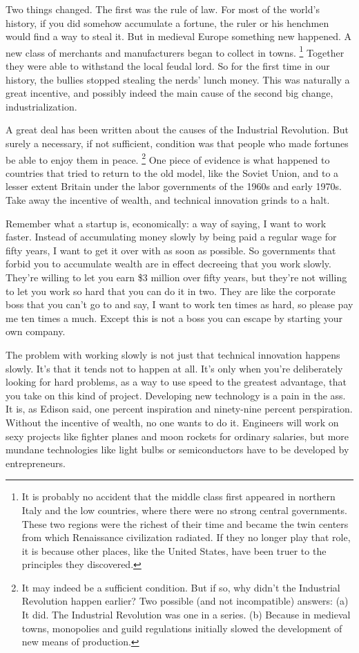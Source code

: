 Two things changed. The first was the rule of law. For most of the
world's history, if you did somehow accumulate a fortune, the ruler or
his henchmen would find a way to steal it. But in medieval Europe
something new happened. A new class of merchants and manufacturers began
to collect in towns. \footnote{It is probably no accident that the middle class first appeared
in northern Italy and the low countries, where there were no strong
central governments. These two regions were the richest of their time
and became the twin centers from which Renaissance civilization
radiated. If they no longer play that role, it is because other places,
like the United States, have been truer to the principles they
discovered.} Together they were able
to withstand the local feudal lord. So for the first time in our
history, the bullies stopped stealing the nerds' lunch money. This was
naturally a great incentive, and possibly indeed the main cause of the
second big change, industrialization.

A great deal has been written about the causes of the Industrial
Revolution. But surely a necessary, if not sufficient, condition was
that people who made fortunes be able to enjoy them in peace.
\footnote{It may indeed be a sufficient condition. But if so, why didn't
the Industrial Revolution happen earlier? Two possible (and not
incompatible) answers: (a) It did. The Industrial Revolution was one in
a series. (b) Because in medieval towns, monopolies and guild
regulations initially slowed the development of new means of production.} One piece of evidence is what happened to
countries that tried to return to the old model, like the Soviet Union,
and to a lesser extent Britain under the labor governments of the 1960s
and early 1970s. Take away the incentive of wealth, and technical
innovation grinds to a halt.

Remember what a startup is, economically: a way of saying, I want to
work faster. Instead of accumulating money slowly by being paid a
regular wage for fifty years, I want to get it over with as soon as
possible. So governments that forbid you to accumulate wealth are in
effect decreeing that you work slowly. They're willing to let you earn
\$3 million over fifty years, but they're not willing to let you work so
hard that you can do it in two. They are like the corporate boss that
you can't go to and say, I want to work ten times as hard, so please pay
me ten times a much. Except this is not a boss you can escape by
starting your own company.

The problem with working slowly is not just that technical innovation
happens slowly. It's that it tends not to happen at all. It's only when
you're deliberately looking for hard problems, as a way to use speed to
the greatest advantage, that you take on this kind of project.
Developing new technology is a pain in the ass. It is, as Edison said,
one percent inspiration and ninety-nine percent perspiration. Without
the incentive of wealth, no one wants to do it. Engineers will work on
sexy projects like fighter planes and moon rockets for ordinary
salaries, but more mundane technologies like light bulbs or
semiconductors have to be developed by entrepreneurs.


